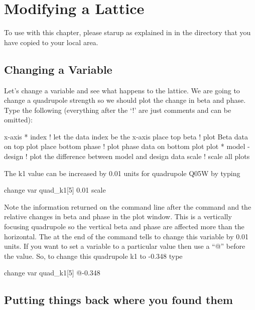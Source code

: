 \chapter{Modifying a Lattice}
\label{c:lattice.mod}

To use \tao with this chapter, please starup \tao as explained in  in 
the  directory that you have copied to your local area.

\section{Changing a Variable}
\label{s:change.variable}

Let's change a variable and see what happens to the lattice. We are going to
change a quadrupole strength so we should plot the change in beta and phase.
Type the following (everything after the `!' are just comments and can be
omitted):
\begin{example}
  x-axis * index        ! let the data index be the x-axis
  place top beta          ! plot Beta data on top plot
  place bottom phase      ! plot phase data on bottom plot
  plot * model - design ! plot the difference between model and design data
  scale                   ! scale all plots
\end{example}

The k1 value can be increased by 0.01 units for quadrupole Q05W by typing
\begin{example}
  change var quad\_k1[5] 0.01
  scale
\end{example}
Note the information returned on the command line after the command
and the relative changes in beta and phase in the plot window. This is
a vertically focusing quadrupole so the vertical beta and phase are
affected more than the horizontal. The  at the end of the
command tells \tao to change this variable by 0.01 units. If you want
to set a variable to a particular value then use a ``@'' before the
value. So, to change this quadrupole k1 to -0.348 type
\begin{example}
  change var quad\_k1[5] @-0.348
\end{example}

\section{Putting things back where you found them}
\label{s:put_it_back}

